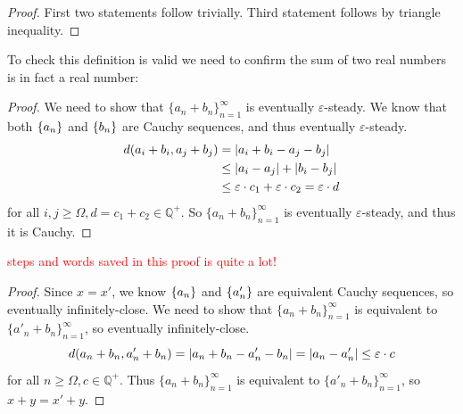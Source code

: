 {
\begin{proof}
    First two statements follow trivially. Third statement follows by triangle inequality. 
\end{proof}


To check this definition is valid we need to confirm the sum of two real numbers is in fact a real number:

\begin{proof}
    We need to show that $\{a_n+b_n\}_{n=1}^{\infty}$ is eventually $\varepsilon$-steady. We know that both $\{a_n\}$ and $\{b_n\}$ are Cauchy sequences, and thus eventually $\varepsilon$-steady.
    \begin{align*}
        d(a_i+b_i, a_j+b_j)&=\left\lvert a_i+b_i - a_j -b_j \right\rvert \\
        & \leq \left\lvert a_i-a_j \right\rvert + \left\lvert b_i - b_j \right\rvert \\
        & \leq \varepsilon \cdot c_1 + \varepsilon \cdot c_2 = \varepsilon \cdot d
    \end{align*}
    for all $i,j \geq \Omega, d=c_1+c_2 \in \mathbb{Q}^+$. So $\{a_n+b_n\}_{n=1}^{\infty}$ is eventually $\varepsilon$-steady, and thus it is Cauchy.
\end{proof}
\textcolor{red}{steps and words saved in this proof is quite a lot!}

\begin{proof}
    Since $x=x'$, we know $\{a_n\}$ and $\{a'_n\}$ are equivalent Cauchy sequences, so eventually infinitely-close. We need to show that $\{a_n+b_n\}_{n=1}^{\infty}$ is equivalent to $\{a'_n+b_n\}_{n=1}^{\infty}$, so eventually infinitely-close. 
    \begin{equation*}
        d(a_n+b_n, a'_n+b_n)= \left\lvert a_n+b_n - a'_n-b_n \right\rvert = \left\lvert a_n - a'_n \right\rvert \leq \varepsilon \cdot c
    \end{equation*}
    for all $n \geq \Omega, c \in \mathbb{Q}^+$. Thus $\{a_n+b_n\}_{n=1}^{\infty}$ is equivalent to $\{a'_n+b_n\}_{n=1}^{\infty}$, so $x+y=x'+y$.
\end{proof}

}
